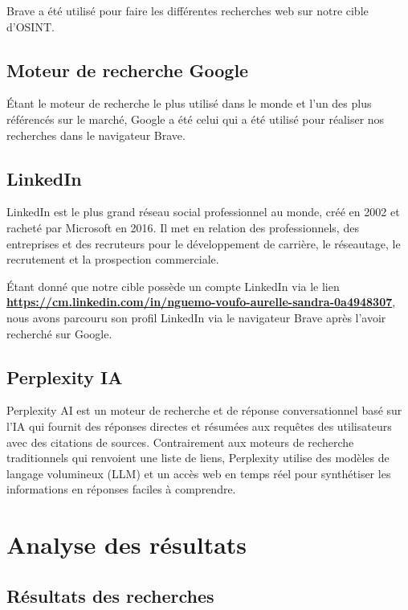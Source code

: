 \documentclass[12pt, a4paper]{article}
\begin{document}
Brave a été utilisé pour faire les différentes recherches web sur notre cible d'OSINT.

\subsection{Moteur de recherche Google}

Étant le moteur de recherche le plus utilisé dans le monde et l'un des plus référencés sur le marché, Google a été celui qui a été utilisé pour réaliser nos recherches dans le navigateur Brave.

\subsection{LinkedIn}

LinkedIn est le plus grand réseau social professionnel au monde, créé en 2002 et racheté par Microsoft en 2016. Il met en relation des professionnels, des entreprises et des recruteurs pour le développement de carrière, le réseautage, le recrutement et la prospection commerciale.

Étant donné que notre cible possède un compte LinkedIn via le lien \textbf{\url{https://cm.linkedin.com/in/nguemo-voufo-aurelle-sandra-0a4948307}}, nous avons parcouru son profil LinkedIn via le navigateur Brave après l'avoir recherché sur Google.

\subsection{Perplexity IA}

Perplexity AI est un moteur de recherche et de réponse conversationnel basé sur l'IA qui fournit des réponses directes et résumées aux requêtes des utilisateurs avec des citations de sources. Contrairement aux moteurs de recherche traditionnels qui renvoient une liste de liens, Perplexity utilise des modèles de langage volumineux (LLM) et un accès web en temps réel pour synthétiser les informations en réponses faciles à comprendre.

\section{Analyse des résultats}

\subsection{Résultats des recherches}
\end{document}

